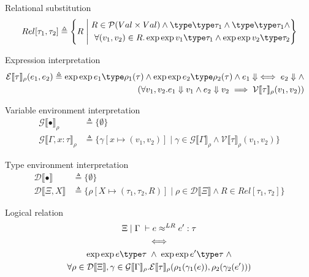 \documentclass[twoside,11pt,openright]{report}
\theoremstyle{definition}
\newcommand{\var}{x}
\newcommand{\expr}{e}
\newcommand{\val}{v}
\newcommand{\Tvar}{X}
\newcommand{\typ}{\tau}
\newcommand{\venv}{\Gamma}
\newcommand{\tenv}{\Xi}
\newcommand{\empvenv}{\bullet}
\newcommand{\emptenv}{\bullet}
\def\envs#1#2\exp#3\type#4{#1 \; | \; #2 \; \vdash #3 : #4}
\def\envstyp#1#2\type#3{#1 \; | \; #2 \; \vdash #3}
\newcommand{\ValInp}[2]{\mathcal{V} \llbracket #1 \rrbracket_{#2}}
\newcommand{\ValInpGen}[2]{\ValInp{#1}{#2}(\val_1, \val_2)}
\newcommand{\ExpInp}[2]{\mathcal{E} \llbracket #1 \rrbracket_{#2}}
\newcommand{\VenvInp}[2]{\mathcal{G} \llbracket #1 \rrbracket_{#2}}
\newcommand{\TenvInp}[1]{\mathcal{D} \llbracket #1 \rrbracket}
\newcommand{\LogRel}[5]{#1 \; | \; #2 \; \vdash #3 \approx^{LR} #4 : #5}
\newcommand{\map}[2]{#1 \mapsto #2}
\begin{document}
Relational substitution
\begin{align*}
  Rel[\typ_1, \typ_2] \triangleq 
  \left\{R \; \middle\vert \;
  \begin{aligned}
    R \in \mathcal{P}(Val \times Val) \land \envstyp \emptenv \empvenv \type \typ_1 \land \envstyp \emptenv \empvenv \type \typ_1 \land\\ \forall (\val_1, \val_2) \in R . \envs \emptenv \empvenv \exp \val_1 \type \typ_1 \land \envs \emptenv \empvenv \exp \val_2 \type \typ_2
  \end{aligned}
  \right\}
\end{align*}

Expression interpretation
\begin{align*}
  \ExpInp{\typ}{\rho}(\expr_1, \expr_2) &\triangleq 
  \begin{aligned}[t]
    \envs \emptenv \empvenv \exp \expr_1 \type \rho_1(\typ) \land \envs \emptenv \empvenv \exp \expr_2 \type \rho_2(\typ) \land \expr_1 \Downarrow \iff \expr_2 \Downarrow \land\\
    (\forall \val_1, \val_2 . \expr_1 \Downarrow \val_1 \land \expr_2 \Downarrow \val_2 \implies \ValInpGen{\typ}{\rho})
  \end{aligned}
\end{align*}

Variable environment interpretation
\begin{align*}
  \VenvInp{\empvenv}{\rho} &\triangleq \{ \emptyset \}\\
  \VenvInp{\venv, \var : \typ}{\rho} &\triangleq \{\gamma[\map{\var}{(\val_1, \val_2)}] \mid \gamma \in \VenvInp{\venv}{\rho} \land \ValInpGen{\typ}{\rho}\}
\end{align*}

Type environment interpretation
\begin{align*}
  \TenvInp{\empvenv} &\triangleq \{ \emptyset \}\\
  \TenvInp{\tenv, \Tvar} &\triangleq \{\rho[\map{\Tvar}{(\typ_1, \typ_2, R)}] \mid \rho \in \TenvInp{\tenv} \land R \in Rel[\typ_1, \typ_2]\}
\end{align*}

Logical relation
\begin{equation}
  \begin{gathered}
    \LogRel{\tenv}{\venv}{\expr}{\expr'}{\typ}\\
    \iff\\
    \envs \tenv \venv \exp \expr \type \typ \; \land \; \envs \tenv \venv \exp \expr' \type \typ \; \land\\
    \forall \rho \in \TenvInp{\tenv}, \gamma \in \VenvInp{\venv}{\rho} . 
    \ExpInp{\typ}{\rho}(\rho_1(\gamma_1(\expr)), \rho_2(\gamma_2(\expr')))
  \end{gathered}
\end{equation}
\end{document}

